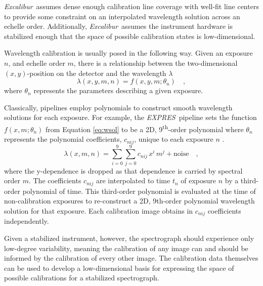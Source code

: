 \documentclass[12pt, onecolumn]{aastex63}
\newcommand{\project}[1]{\textsl{#1}}
\newcommand{\name}{\project{Excalibur}}
\newcommand{\acronym}[1]{{\small{#1}}}
\newcommand{\expres}{\project{\acronym{EXPRES}}}
\begin{document}
\name\ assumes dense enough calibration line coverage with well-fit line centers to provide some constraint on an interpolated wavelength solution across an echelle order.  Additionally, \name\ assumes the instrument hardware is stabilized enough that the space of possible calibration states is low-dimensional.

Wavelength calibration is usually posed in the following way.  Given an exposure $n$, and echelle order $m$, there is a relationship between
the two-dimensional $(x,y)$-position on the detector and the
wavelength $\lambda$
\begin{equation}
\lambda(x,y,m,n) = f(x,y,m;\theta_{n})
\quad ,
\label{eq:wsol}
\end{equation}
where $\theta_{n}$ represents the parameters describing a given exposure.

Classically, pipelines employ polynomials to construct smooth wavelength solutions for each exposure.  For example, the \expres\ pipeline sets the function $f(x,m;\theta_{n})$ from Equation \ref{eq:wsol} to be a 2D, 9\textsuperscript{th}-order polynomial where $\theta_{n}$ represents the polynomial coefficients, $c_{nij}$, unique to each exposure $n$ \citep{petersburg2020}.
\begin{equation}
\lambda(x,m,n) = \sum_{i=0}^9\sum_{j=0}^9 c_{nij}\, x^i\,m^j + \mathrm{noise}
\quad ,
\label{eq:poly_wsol}
\end{equation}
where the y-dependence is dropped as that dependence is carried by spectral order $m$.  The coefficients $c_{nij}$ are interpolated to time $t_n$ of exposure $n$ by a third-order polynomial of time.  This third-order polynomial is evaluated at the time of non-calibration exposures to re-construct a 2D, 9th-order polynomial wavelength solution for that exposure.  Each calibration image obtains in $c_{nij}$ coefficients independently.

Given a stabilized instrument, however, the spectrograph should experience only low-degree variability, meaning the calibration of any image can and should be informed by the calibration of every other image.  The calibration data themselves can be used to develop a low-dimensional basis for expressing the space of possible calibrations for a stabilized spectrograph.
\end{document}
